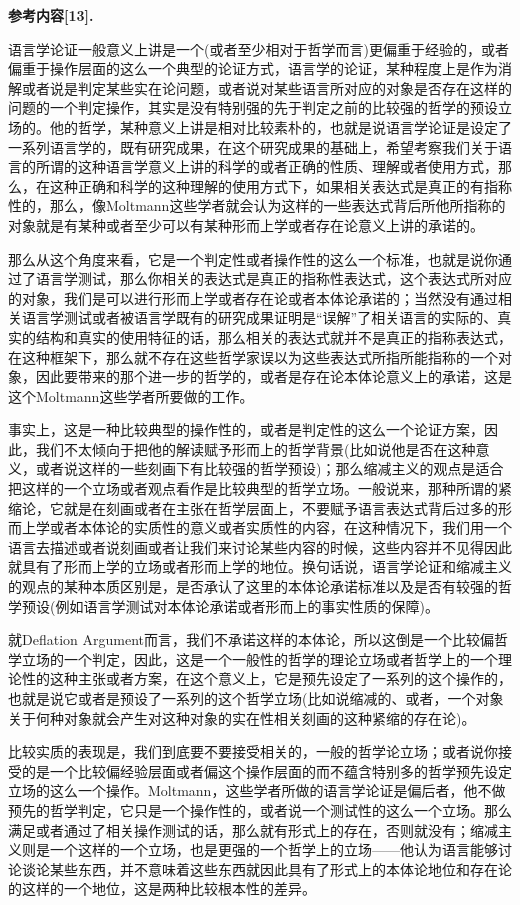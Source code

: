 \documentclass{article}
\begin{document}
\textbf{\kaishu 参考内容[13].}
{
语言学论证一般意义上讲是一个(或者至少相对于哲学而言)更偏重于经验的，或者偏重于操作层面的这么一个典型的论证方式，语言学的论证，某种程度上是作为消解或者说是判定某些实在论问题，或者说对某些语言所对应的对象是否存在这样的问题的一个判定操作，其实是没有特别强的先于判定之前的比较强的哲学的预设立场的。他的哲学，某种意义上讲是相对比较素朴的，也就是说语言学论证是设定了一系列语言学的，既有研究成果，在这个研究成果的基础上，希望考察我们关于语言的所谓的这种语言学意义上讲的科学的或者正确的性质、理解或者使用方式，那么，在这种正确和科学的这种理解的使用方式下，如果相关表达式是真正的有指称性的，那么，像Moltmann这些学者就会认为这样的一些表达式背后所他所指称的对象就是有某种或者至少可以有某种形而上学或者存在论意义上讲的承诺的。

那么从这个角度来看，它是一个判定性或者操作性的这么一个标准，也就是说你通过了语言学测试，那么你相关的表达式是真正的指称性表达式，这个表达式所对应的对象，我们是可以进行形而上学或者存在论或者本体论承诺的；当然没有通过相关语言学测试或者被语言学既有的研究成果证明是“误解”了相关语言的实际的、真实的结构和真实的使用特征的话，那么相关的表达式就并不是真正的指称表达式，在这种框架下，那么就不存在这些哲学家误以为这些表达式所指所能指称的一个对象，因此要带来的那个进一步的哲学的，或者是存在论本体论意义上的承诺，这是这个Moltmann这些学者所要做的工作。

事实上，这是一种比较典型的操作性的，或者是判定性的这么一个论证方案，因此，我们不太倾向于把他的解读赋予形而上的哲学背景(比如说他是否在这种意义，或者说这样的一些刻画下有比较强的哲学预设)；那么缩减主义的观点是适合把这样的一个立场或者观点看作是比较典型的哲学立场。一般说来，那种所谓的紧缩论，它就是在刻画或者在主张在哲学层面上，不要赋予语言表达式背后过多的形而上学或者本体论的实质性的意义或者实质性的内容，在这种情况下，我们用一个语言去描述或者说刻画或者让我们来讨论某些内容的时候，这些内容并不见得因此就具有了形而上学的立场或者形而上学的地位。换句话说，语言学论证和缩减主义的观点的某种本质区别是，是否承认了这里的本体论承诺标准以及是否有较强的哲学预设(例如语言学测试对本体论承诺或者形而上的事实性质的保障)。

就Deflation Argument而言，我们不承诺这样的本体论，所以这倒是一个比较偏哲学立场的一个判定，因此，这是一个一般性的哲学的理论立场或者哲学上的一个理论性的这种主张或者方案，在这个意义上，它是预先设定了一系列的这个操作的，也就是说它或者是预设了一系列的这个哲学立场(比如说缩减的、或者，一个对象关于何种对象就会产生对这种对象的实在性相关刻画的这种紧缩的存在论)。

比较实质的表现是，我们到底要不要接受相关的，一般的哲学论立场；或者说你接受的是一个比较偏经验层面或者偏这个操作层面的而不蕴含特别多的哲学预先设定立场的这么一个操作。Moltmann，这些学者所做的语言学论证是偏后者，他不做预先的哲学判定，它只是一个操作性的，或者说一个测试性的这么一个立场。那么满足或者通过了相关操作测试的话，那么就有形式上的存在，否则就没有；缩减主义则是一个这样的一个立场，也是更强的一个哲学上的立场——他认为语言能够讨论谈论某些东西，并不意味着这些东西就因此具有了形式上的本体论地位和存在论的这样的一个地位，这是两种比较根本性的差异。

}
\end{document}
